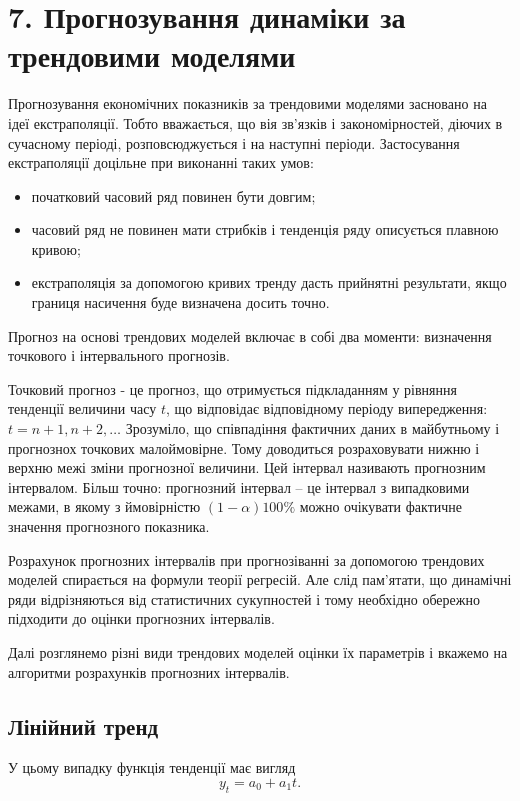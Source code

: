 \documentclass[a4paper, fontsize=10pt, oneside]{article}
\begin{document}
	\chapter{\Large \bf 7. Прогнозування динаміки за трендовими моделями}	

	Прогнозування економічних показників за трендовими моделями засновано на ідеї екстраполяції. Тобто вважається, що вія зв'язків і закономірностей, діючих в сучасному періоді, розповсюджується і на наступні періоди. Застосування екстраполяції доцільне при виконанні таких умов:
		\begin{itemize}
		\item{початковий часовий ряд повинен бути довгим;}
		\item{часовий ряд не повинен мати стрибків і тенденція ряду описується плавною кривою;}
		\item{екстраполяція за допомогою кривих тренду дасть прийнятні результати, якщо границя насичення буде визначена досить точно.}
		\end{itemize}
		
		Прогноз на основі трендових моделей включає в собі два моменти: визначення точкового і інтервального прогнозів.
		
		Точковий прогноз - це прогноз, що отримується підкладанням у рівняння тенденції величини часу $t$, що відповідає відповідному періоду випередження: $t = n+1, n+2, \dots$\newline
		Зрозуміло, що співпадіння фактичних даних в майбутньому і прогнознох точкових малоймовірне. Тому доводиться розраховувати нижню і верхню межі зміни прогнозної величини. Цей інтервал називають прогнозним інтервалом. Більш точно: прогнозний інтервал -- це інтервал з випадковими межами, в якому з ймовірністю $(1 - \alpha) 100\%$ можно очікувати фактичне значення прогнозного показника.
		
		Розрахунок прогнозних інтервалів при прогнозіванні за допомогою трендових моделей спирається на формули теорії регресій. Але слід пам'ятати, що динамічні ряди відрізняються від статистичних сукупностей і тому необхідно обережно підходити до оцінки прогнозних інтервалів.
		
		Далі розглянемо різні види трендових моделей оцінки їх параметрів і вкажемо на алгоритми розрахунків прогнозних інтервалів.
		
		\section{Лінійний тренд}
		У цьому випадку функція тенденції має вигляд 
		\begin{equation*}
		y_t = a_0 + a_1 t.
		\end{equation*}		
		
\end{document}
